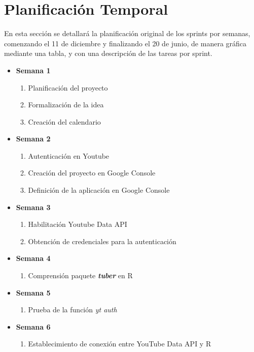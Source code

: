 \documentclass[a4paper,12pt,twoside]{memoir}
\begin{document}
\section{Planificación Temporal}
En esta sección se detallará la planificación original de los sprints por semanas, comenzando el 11 de diciembre y finalizando el 20 de junio, de manera gráfica mediante una tabla, y con una descripción de las tareas por sprint.

\begin{itemize}
    \item \textbf{Semana 1}
    \begin{enumerate}
        \item Planificación del proyecto
        \item Formalización de la idea
        \item Creación del calendario
    \end{enumerate}
    \item \textbf{Semana 2}
    \begin{enumerate}
        \item Autenticación en Youtube
        \item Creación del proyecto en Google Console
        \item Definición de la aplicación en Google Console
    \end{enumerate}
    \item \textbf{Semana 3}
    \begin{enumerate}
        \item Habilitación Youtube Data API
        \item Obtención de credenciales para la autenticación
    \end{enumerate}
    \item \textbf{Semana 4}
    \begin{enumerate}
        \item Comprensión paquete \textbf{\textit{tuber}} en R
    \end{enumerate}
    \item \textbf{Semana 5}
    \begin{enumerate}
        \item Prueba de la función \textit{yt auth}
    \end{enumerate}
    \item \textbf{Semana 6}
    \begin{enumerate}
        \item Establecimiento de conexión entre YouTube Data API y R
    \end{enumerate}
    

\end{itemize}
\end{document}
